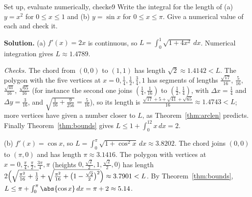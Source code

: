 \documentclass[11pt]{article}
\begin{document}
\begin{exmp}{Set up, evaluate numerically, check}{e9}
Write the integral for the length of (a) $y=x^2$ for $0\le x\le1$ and (b) $y=\sin x$ for $0\le x\le\pi$. Give a numerical value of each and check it.

\textbf{Solution.} (a) $f'(x)=2x$ is continuous, so $L=\int_0^1\sqrt{1+4x^2}\,dx$. Numerical integration gives $L\approx1.4789$.

\emph{Checks.} The chord from $(0,0)$ to $(1,1)$ has length $\sqrt2\approx1.4142<L$. The polygon with the five vertices at $x=0,\frac14,\frac12,\frac34,1$ has segments of lengths $\frac{\sqrt{17}}{16}$, $\frac5{16}$, $\frac{\sqrt{41}}{16}$, $\frac{\sqrt{65}}{16}$ (for instance the second one joins $(\frac14,\frac1{16})$ to $(\frac12,\frac14)$, with $\Delta x=\frac14$ and $\Delta y=\frac3{16}$, and $\sqrt{\frac1{16}+\frac9{256}}=\frac5{16}$), so its length is $\frac{\sqrt{17}+5+\sqrt{41}+\sqrt{65}}{16}\approx1.4743<L$; more vertices have given a number closer to $L$, as Theorem~\ref{thm:arclen} predicts. Finally Theorem~\ref{thm:bounds} gives $L\le1+\int_0^12x\,dx=2$.

(b) $f'(x)=\cos x$, so $L=\int_0^\pi\sqrt{1+\cos^2x}\,dx\approx3.8202$. The chord joins $(0,0)$ to $(\pi,0)$ and has length $\pi\approx3.1416$. The polygon with vertices at $x=0,\frac\pi4,\frac\pi2,\frac{3\pi}4,\pi$ (heights $0,\frac{\sqrt2}2,1,\frac{\sqrt2}2,0$) has length $2\Bigl(\sqrt{\frac{\pi^2}{16}+\frac12}+\sqrt{\frac{\pi^2}{16}+\bigl(1-\frac{\sqrt2}2\bigr)^2}\Bigr)\approx3.7901<L$. By Theorem~\ref{thm:bounds}, $L\le\pi+\int_0^\pi\abs{\cos x}\,dx=\pi+2\approx5.14$.


\end{exmp}
\end{document}
